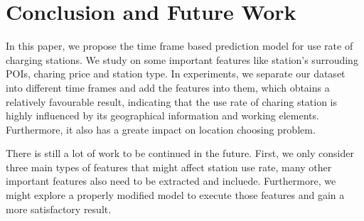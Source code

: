 \documentclass[conference]{IEEEtran}
\begin{document}
\section{Conclusion and Future Work}
In this paper, we propose the time frame based prediction model for use rate of charging stations. We study on some important features like station's surrouding POIs, charing price and station type. In experiments, we separate our dataset into different time frames and add the features into them, which obtains a relatively favourable result, indicating that the use rate of charing station is highly influenced by its geographical information and working elements. Furthermore, it also has a greate impact on location choosing problem.

There is still a lot of work to be continued in the future. First, we only consider three main types of features that might affect station use rate, many other important features also need to be extracted and incluede. Furthermore, we might explore a properly modified model to execute those features and gain a more satisfactory result.




\end{document}
